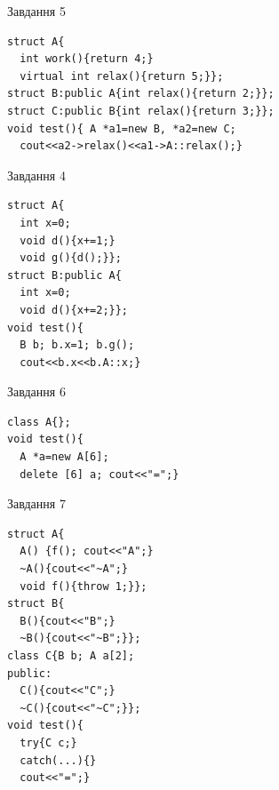 \documentclass[12pt, ukrainian]{article}
\begin{document}
{{{{{{{{{{{{{{{{\begin{minipage}[t]{11cm}
               
{\begin{center}Завдання {5}\end{center}}
\vspace{-6mm}

\begin{verbatim}
struct A{
  int work(){return 4;}
  virtual int relax(){return 5;}};
struct B:public A{int relax(){return 2;}};
struct C:public B{int relax(){return 3;}};
void test(){ A *a1=new B, *a2=new C;
  cout<<a2->relax()<<a1->A::relax();}
\end{verbatim}            


\end{minipage}
\vline \hspace{8mm}
\begin{minipage}[t]{7cm}
               
{\begin{center}Завдання {4}\end{center}}
\vspace{-6mm}

\begin{verbatim}
struct A{
  int x=0;
  void d(){x+=1;}
  void g(){d();}};
struct B:public A{
  int x=0;
  void d(){x+=2;}};
void test(){
  B b; b.x=1; b.g();
  cout<<b.x<<b.A::x;}
\end{verbatim}            


               
{\begin{center}Завдання {6}\end{center}}
\vspace{-6mm}

\begin{verbatim}
class A{};
void test(){
  A *a=new A[6]; 
  delete [6] a; cout<<"=";}
\end{verbatim}            


               
{\begin{center}Завдання {7}\end{center}}
\vspace{-6mm}

\begin{verbatim}
struct A{
  A() {f(); cout<<"A";}
  ~A(){cout<<"~A";} 
  void f(){throw 1;}};
struct B{
  B(){cout<<"B";}
  ~B(){cout<<"~B";}};
class C{B b; A a[2];
public:
  C(){cout<<"C";}
  ~C(){cout<<"~C";}};
void test(){
  try{C c;} 
  catch(...){} 
  cout<<"=";}
\end{verbatim}            



\end{minipage}}}}}}}}}}}}}}}}}
\end{document}
